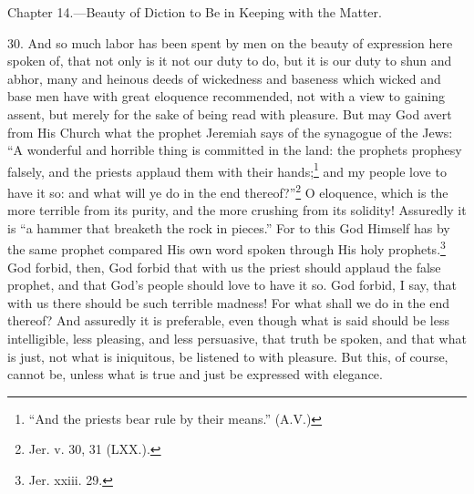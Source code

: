 
Chapter 14.—Beauty of Diction to Be in Keeping with the Matter.

30. And so much labor has been spent by men on the beauty of expression here spoken of, that not only is it not our duty to do, but it is our duty to shun and abhor, many and heinous deeds of wickedness and baseness which wicked and base men have with great eloquence recommended, not with a view to gaining assent, but merely for the sake of being read with pleasure. But may God avert from His Church what the prophet Jeremiah says of the synagogue of the Jews: “A wonderful and horrible thing is committed in the land: the prophets prophesy falsely, and the priests applaud them with their hands;\footnote{“And the priests bear rule by their means.” (A.V.)} and my people love to have it so: and what will ye do in the end thereof?”\footnote{Jer. v. 30, 31 (LXX.).} O eloquence, which is the more terrible from its purity, and the more crushing from its solidity! Assuredly it is “a hammer that breaketh the rock in pieces.” For to this God Himself has by the same prophet compared His own word spoken through His holy prophets.\footnote{Jer. xxiii. 29.} God forbid, then, God forbid that with us the priest should applaud the false prophet, and that God’s people should love to have it so. God forbid, I say, that with us there should be such terrible madness! For what shall we do in the end thereof? And assuredly it is preferable, even though what is said should be less intelligible, less pleasing, and less persuasive, that truth be spoken, and that what is just, not what is iniquitous, be listened to with pleasure. But this, of course, cannot be, unless what is true and just be expressed with elegance.

